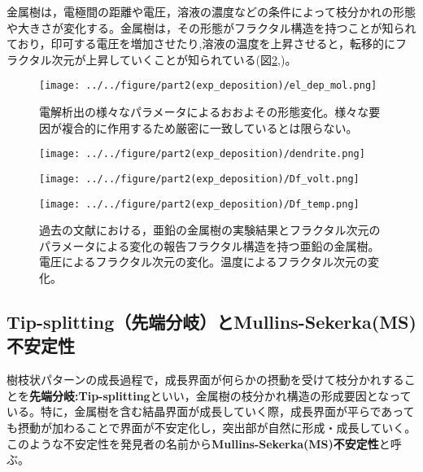 \documentclass[autodetect-engine,dvi=dvipdfmx,a4paper,ja=standard,oneside,openany,11pt,draft]{bxjsbook}
\begin{document}
金属樹は，電極間の距離や電圧，溶液の濃度などの条件によって枝分かれの形態や大きさが変化する。金属樹は，その形態がフラクタル構造を持つことが知られており\cite{matsushita1984fractal}，印可する電圧を増加させたり\cite{matsushita1984fractal},溶液の温度を上昇させると\cite{suda2003temperature}，転移的にフラクタル次元が上昇していくことが知られている(図\ref{fig:fractal_dimension},)。
\begin{figure}[htbp]
  \centering
  \texttt{[image: ../../figure/part2(exp\_deposition)/el\_dep\_mol.png]}
  \caption{電解析出の様々なパラメータによるおおよその形態変化。様々な要因が複合的に作用するため厳密に一致しているとは限らない。}
  \label{fig:el_dep_mol}
\end{figure}

\begin{figure}[htbp]
  \begin{minipage}{0.28\textwidth}
    \subcaption{}
    \centering
    \texttt{[image: ../../figure/part2(exp\_deposition)/dendrite.png]}
    \label{fig:el_dep_fractal}
  \end{minipage}
  \begin{minipage}
    {0.35\textwidth}
    \subcaption{}
    \centering
    \texttt{[image: ../../figure/part2(exp\_deposition)/Df\_volt.png]}
    \label{fig:Df_volt}
  \end{minipage}
  \begin{minipage}
    {0.35\textwidth}
    \subcaption{}
    \centering
    \texttt{[image: ../../figure/part2(exp\_deposition)/Df\_temp.png]}
    \label{fig:Df_temp}
  \end{minipage}
  \caption{過去の文献における，亜鉛の金属樹の実験結果とフラクタル次元のパラメータによる変化の報告フラクタル構造を持つ亜鉛の金属樹\cite{matsushita1984fractal}。電圧によるフラクタル次元の変化\cite{matsushita1984fractal}。温度によるフラクタル次元の変化\cite{suda2003temperature}。}
  \label{fig:fractal_dimension}
\end{figure}

\subsection{Tip-splitting（先端分岐）とMullins-Sekerka(MS)不安定性}
樹枝状パターンの成長過程で，成長界面が何らかの摂動を受けて枝分かれすることを\textbf{先端分岐:Tip-splitting}といい，金属樹の枝分かれ構造の形成要因となっている。特に，金属樹を含む結晶界面が成長していく際，成長界面が平らであっても摂動が加わることで界面が不安定化し，突出部が自然に形成・成長していく。このような不安定性を発見者の名前から\textbf{Mullins-Sekerka(MS)不安定性}と呼ぶ。
\end{document}
